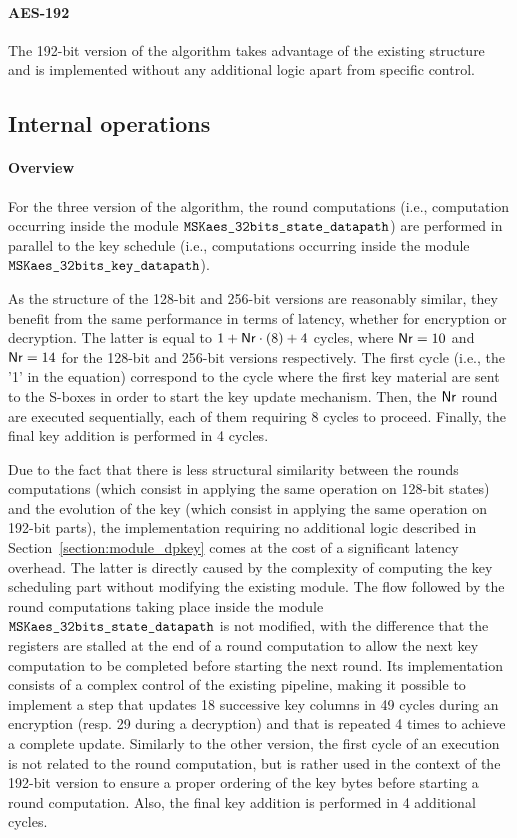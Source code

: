 \documentclass{scrartcl}
\begin{document}
\paragraph{AES-192}
The 192-bit version of the algorithm takes advantage of the existing
structure and is implemented without any additional logic apart from specific
control.  

\subsection{Internal operations}

\paragraph{Overview}
For the three version of the algorithm, the round computations (i.e.,
computation occurring inside the module $\texttt{MSKaes\_32bits\_state\_datapath}$) are performed in
parallel to the key schedule (i.e., computations occurring inside the module
$\texttt{MSKaes\_32bits\_key\_datapath}$).

As the structure of the 128-bit and 256-bit versions are reasonably similar,
they benefit from the same performance in terms of latency, whether for
encryption or decryption.  The latter is equal to $1+\mathsf{Nr}\cdot(8)+4$ cycles,
where $\mathsf{Nr} = 10$ and $\mathsf{Nr}= 14$ for the 128-bit and 256-bit versions
respectively. The first cycle (i.e., the '1' in the equation) correspond to the
cycle where the first key material are sent to the S-boxes in order to start the
key update mechanism. Then, the $\mathsf{Nr}$ round are executed sequentially, each of
them requiring 8 cycles to proceed.  Finally, the final key addition is
performed in 4 cycles. 

Due to the fact that there is less structural similarity between the rounds
computations (which consist in applying the same operation on 128-bit states)
and the evolution of the key (which consist in applying the same operation on
192-bit parts), the implementation requiring no additional logic described in
Section~\ref{section:module_dpkey} comes at the cost of a significant latency
overhead. The latter is directly caused by the complexity of computing the key
scheduling part without modifying the existing module. The flow followed by the
round computations taking place inside the module $\texttt{MSKaes\_32bits\_state\_datapath}$ is not
modified, with the difference that the registers are stalled at the end of a
round computation to allow the next key computation to be completed before
starting the next round.  Its implementation consists of a complex control of
the existing pipeline, making it possible to implement a step that updates 18
successive key columns in 49 cycles during an encryption (resp. 29 during a
decryption) and that is repeated 4 times to achieve a complete update.
Similarly to the other version, the first cycle of an execution is not related
to the round computation, but is rather used in the context of the 192-bit
version to ensure a proper ordering of the key bytes before starting a round
computation. Also, the final key addition is performed in 4 additional cycles. 
\end{document}
